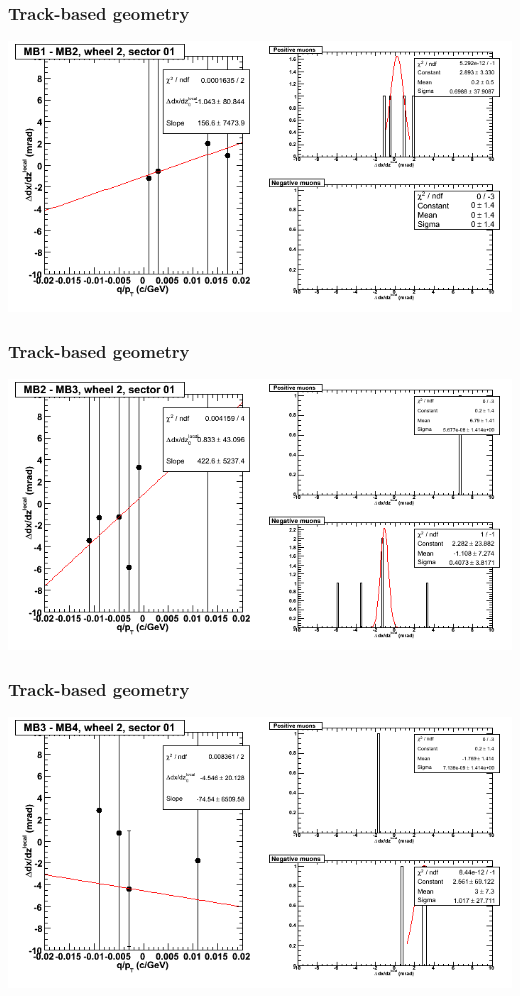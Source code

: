 \documentclass[compress]{beamer}
\begin{document}
\begin{frame}
\frametitle{Track-based geometry}
\includegraphics[width=\linewidth]{NOV4_segdiffs/dt13_slope_E_01_12.png}
\end{frame}

\begin{frame}
\frametitle{Track-based geometry}
\includegraphics[width=\linewidth]{NOV4_segdiffs/dt13_slope_E_01_23.png}
\end{frame}

\begin{frame}
\frametitle{Track-based geometry}
\includegraphics[width=\linewidth]{NOV4_segdiffs/dt13_slope_E_01_34.png}
\end{frame}
\end{document}
